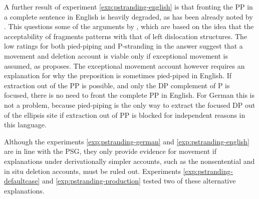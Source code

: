 A further result of experiment \ref{exp:pstranding-english} is that fronting the PP in a complete sentence in English is heavily degraded, as has been already noted by \citet{weir2014a}. This questions some of the arguments by \citet{merchant2004}, which are based on the idea that the acceptability of fragments patterns with that of left dislocation structures. The low ratings for both pied-piping and P-stranding in the answer suggest that a movement and deletion account is viable only if exceptional movement is assumed, as \citet{weir2014} proposes. The exceptional movement account however requires an explanation for why the preposition is sometimes pied-piped in English. If extraction out of the PP is possible, and only the DP complement of P is focused, there is no need to front the complete PP in English. For German this is not a problem, because pied-piping is the only way to extract the focused DP out of the ellipsis site if extraction out of PP is blocked for independent reasons in this language.

Although the experiments \ref{exp:pstranding-german} and \ref{exp:pstranding-english} are in line with the PSG, they only provide evidence for movement if explanations under derivationally simpler accounts, such as the nonsentential and in situ deletion accounts, must be ruled out. Experiments \ref{exp:pstranding-defaultcase} and \ref{exp:pstranding-production} tested two of these alternative explanations.

